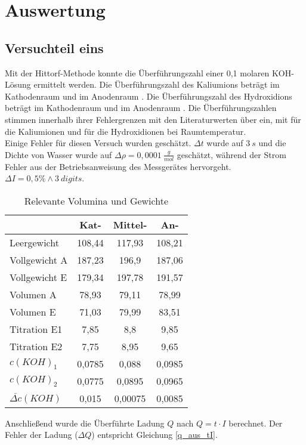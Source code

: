 \section{Auswertung}
\subsection{Versuchteil eins}
Mit der Hittorf-Methode konnte die Überführungszahl einer 0,1 molaren KOH-Lösung ermittelt werden. 
Die Überführungszahl des Kaliumions beträgt im Kathodenraum \tVeinsKat und im Anodenraum \tVeinsAn. 
Die Überführungszahl des Hydroxidions beträgt im Kathodenraum \tVzweiKat und im Anodenraum \tVzweiAn. 
Die Überführungszahlen stimmen innerhalb ihrer Fehlergrenzen mit den Literaturwerten\cite{Lit} über ein, mit \liteins für die Kaliumionen und \litzwei für die Hydroxidionen bei Raumtemperatur.\\
Einige Fehler für diesen Versuch wurden geschätzt.
$\Delta t$ wurde auf $3\ s$ und die Dichte von Wasser wurde auf $\Delta\rho=0,0001\ \frac{g}{mol}$ geschätzt, während der Strom Fehler aus der Betriebsanweisung\cite{Multimeter} des Messgerätes hervorgeht. $\Delta I = 0,5\% \wedge 3\ digits$.

\begin{table}[H]
\centering
\begin{tabular}{lccc}
		& Kat-		& Mittel-	& An-\\
\hline
Leergewicht 	& 108,44 	& 117,93 	& 108,21\\
Vollgewicht A 	& 187,23 	& 196,9 	& 187,06\\
Vollgewicht E 	& 179,34 	& 197,78 	& 191,57\\
Volumen A 	& 78,93 	& 79,11 	& 78,99\\
Volumen E 	& 71,03 	& 79,99 	& 83,51\\
Titration E1 	& 7,85 		& 8,8 		& 9,85\\
Titration E2 	& 7,75 		& 8,95 		& 9,65\\
$c(KOH)_1$	& 0,0785 	& 0,088 	& 0,0985\\
$c(KOH)_2$	& 0,0775 	& 0,0895 	& 0,0965\\
$\bar{\Delta c}(KOH)$ & 0,015 	& 0,00075 	& 0,0085\\
\end{tabular}
\caption{Relevante Volumina und Gewichte}
\label{T2}
\end{table}



Anschließend wurde die Überführte Ladung $Q$ nach $Q=t\cdot I$ berechnet. Der Fehler der Ladung ($\Delta Q$) entspricht Gleichung \ref{q_aus_tI}.

